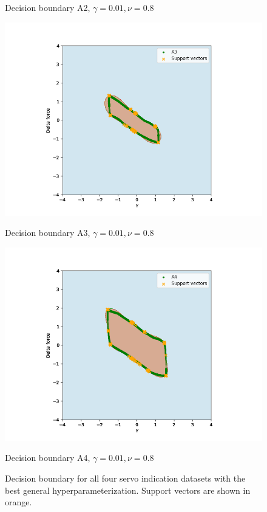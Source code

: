 \begin{figure}[]
\begin{minipage}[b]{0.5\linewidth}
                    \caption*{Decision boundary A2, $\gamma = 0.01, \nu = 0.8$}
                \end{minipage}
                \hfill
                \begin{minipage}[b]{0.5\linewidth}
                    \centering
                    \includegraphics[width = \textwidth]{figures/analysis/oneclass_servo/A3_nu_01_gamma_08.png}
                    \caption*{Decision boundary A3, $\gamma = 0.01, \nu = 0.8$}
                \end{minipage}
                \hfill
                \begin{minipage}[b]{0.5\linewidth}
                    \centering
                    \includegraphics[width = \textwidth]{figures/analysis/oneclass_servo/A4_nu_01_gamma_08.png}
                    \caption*{Decision boundary A4, $\gamma = 0.01, \nu = 0.8$}
                \end{minipage}
                \hfill
                \caption{Decision boundary for all four servo indication datasets with the best general hyperparameterization. Support vectors are shown in orange.}
                \label{fig:dec_bound_all_servo}
            \end{figure}
            
